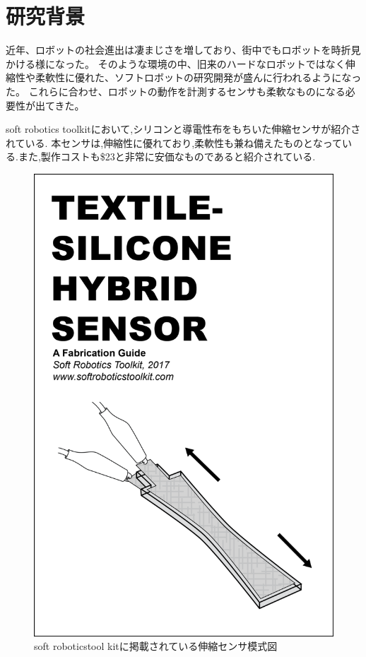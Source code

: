 \section{研究背景}
近年、ロボットの社会進出は凄まじさを増しており、街中でもロボットを時折見かける様になった。
そのような環境の中、旧来のハードなロボットではなく伸縮性や柔軟性に優れた、ソフトロボットの研究開発が盛んに行われるようになった。
これらに合わせ、ロボットの動作を計測するセンサも柔軟なものになる必要性が出てきた。

soft robotics toolkit\cite{MITSoftRobot}において,シリコンと導電性布をもちいた伸縮センサが紹介されている.
本センサは,伸縮性に優れており,柔軟性も兼ね備えたものとなっている.また,製作コストも\$23と非常に安価なものであると紹介されている.
\begin{figure}[h]
    \begin{center}
        \includegraphics[width=0.25\columnwidth,bb=0 0 907 786]{Photo/BackGround/MITSoftRobotics.png}
        \caption{soft roboticstool kitに掲載されている伸縮センサ模式図\cite{MITSoftRobot}}
        \label{MITSoftRobot表紙}
    \end{center}
\end{figure}


